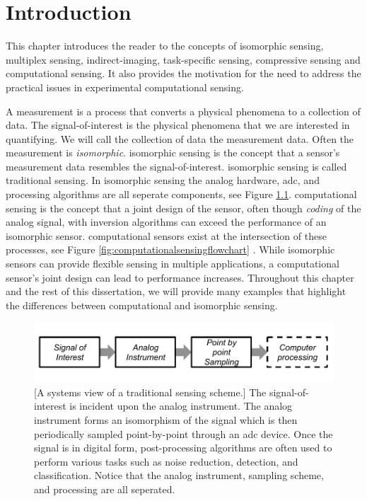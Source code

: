 \chapter{Introduction}\label{chap:Introduction}


This chapter introduces the reader to the concepts of \gls{isomorphic sensing}, \gls{multiplex sensing}, \gls{indirect-imaging}, \gls{task-specific sensing}, \gls{compressive sensing} and \gls{computational sensing}. It also provides the motivation for the need to address the practical issues in experimental computational sensing. 

A \gls{measurement} is a process that converts a physical phenomena to a collection of data. The signal-of-interest is the physical phenomena that we are interested in quantifying. We will call the collection of data the measurement data. Often the measurement is \emph{\gls{isomorphic}}. \Gls{isomorphic sensing} is the concept that a sensor's measurement data resembles the signal-of-interest. \Gls{isomorphic sensing} is called \gls{traditional sensing}. In isomorphic sensing the analog hardware, \acrfull{adc}, and processing algorithms are all seperate components, see Figure \ref{fig:isomorphicsesingflowchart}. \Gls{computational sensing} is the concept that a joint design of the sensor, often though \emph{coding} of the analog signal, with inversion algorithms can exceed the performance of an isomorphic sensor. \Glspl{computational sensor} exist at the intersection of these processes, see Figure \ref{fig:computationalsensingflowchart} \cite{neifeld2006taskSpecificSensing}. While \gls{isomorphic} sensors can provide flexible sensing in multiple applications, a \gls{computational sensor}'s joint design can lead to performance increases. Throughout this chapter and the rest of this dissertation, we will provide many examples that highlight the differences between computational and isomorphic sensing. 

\begin{figure}
    \centering
    \includegraphics[scale=1]{isomorphicsensorflowchart}
    [A systems view of a traditional sensing scheme.]{ The signal-of-interest is incident upon the analog instrument. The analog instrument forms an isomorphism of the signal which is then periodically sampled point-by-point through an \gls{adc} device. Once the signal is in digital form, post-processing algorithms are often used to perform various tasks such as noise reduction, detection, and classification. Notice that the analog instrument, sampling scheme, and processing are all seperated. }
    \label{fig:isomorphicsesingflowchart}
\end{figure}


